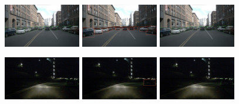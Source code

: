 \documentclass[report.tex]{subfiles}
\begin{document}
    \begin{figure}[h!]
        \centering
        \includegraphics[width=0.3\textwidth]{images/results/saf_vs_hrfuser/samples/s3_day_regular/n008-2018-08-01-15-34-25-0400__CAM_FRONT__1533152655412404_gt.png}\hfill
        \includegraphics[width=0.3\textwidth]{images/results/saf_vs_hrfuser/samples/s3_day_regular/n008-2018-08-01-15-34-25-0400__CAM_FRONT__1533152655412404_former.jpg}\hfill
        \includegraphics[width=0.3\textwidth]{images/results/saf_vs_hrfuser/samples/s3_day_regular/n008-2018-08-01-15-34-25-0400__CAM_FRONT__1533152655412404.png}
      
        \includegraphics[width=0.3\textwidth]{images/results/saf_vs_hrfuser/samples/s4_night_reg/n015-2018-11-14-19-52-02+0800__CAM_FRONT__1542196675862460_gt.png}\hfill
        \includegraphics[width=0.3\textwidth]{images/results/saf_vs_hrfuser/samples/s4_night_reg/n015-2018-11-14-19-52-02+0800__CAM_FRONT__1542196675862460_former.jpg}\hfill
        \includegraphics[width=0.3\textwidth]{images/results/saf_vs_hrfuser/samples/s4_night_reg/n015-2018-11-14-19-52-02+0800__CAM_FRONT__1542196675862460.png}
      

\end{figure}
\end{document}
